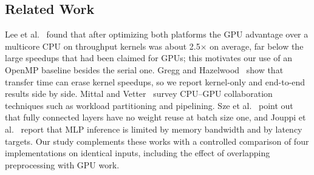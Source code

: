 \subsection{Related Work}
Lee et al.~\cite{lee2010debunking} found that after optimizing both platforms the GPU advantage over a multicore CPU on throughput kernels was about 2.5$\times$ on average, far below the large speedups that had been claimed for GPUs; this motivates our use of an OpenMP baseline besides the serial one. Gregg and Hazelwood~\cite{gregg2011data} show that transfer time can erase kernel speedups, so we report kernel-only and end-to-end results side by side. Mittal and Vetter~\cite{mittal2015survey} survey CPU--GPU collaboration techniques such as workload partitioning and pipelining. Sze et al.~\cite{sze2017efficient} point out that fully connected layers have no weight reuse at batch size one, and Jouppi et al.~\cite{jouppi2017tpu} report that MLP inference is limited by memory bandwidth and by latency targets. Our study complements these works with a controlled comparison of four implementations on identical inputs, including the effect of overlapping preprocessing with GPU work.
